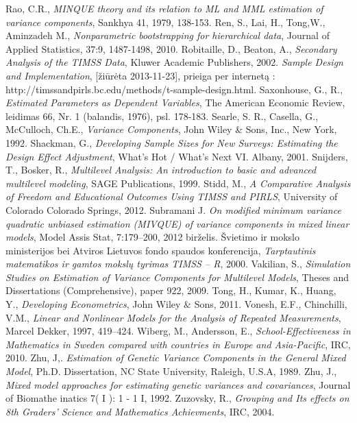 \documentclass[12pt,a4paper]{article}
\begin{document}
\begin{thebibliography}{1}
 Rao, C.R., \textit{MINQUE theory and its relation to ML and MML estimation of variance components}, Sankhya 41, 1979, 138-153.
 Ren, S., Lai, H., Tong,W., Aminzadeh M., \textit{Nonparametric bootstrapping for hierarchical data}, Journal of Applied Statistics, 37:9, 1487-1498, 2010.
 Robitaille, D., Beaton, A., \textit{Secondary Analysis of the TIMSS Data}, Kluwer Academic Publishers, 2002.
 \textit{Sample Design and Implementation}, [žiūrėta 2013-11-23], prieiga per internetą : http://timssandpirls.bc.edu/methods/t-sample-design.html.
 Saxonhouse, G., R., \textit{Estimated Parameters as Dependent Variables}, The American Economic Review,
leidimas 66, Nr. 1 (balandis, 1976), psl. 178-183.
 Searle, S. R., Casella, G., McCulloch, Ch.E., \textit{Variance Components}, John Wiley \& Sons, Inc., New York, 1992.
 Shackman, G., \textit{Developing Sample Sizes for New Surveys: Estimating the Design Effect Adjustment}, What’s Hot / What’s Next VI. Albany, 2001.
 Snijders, T., Bosker, R., \textit{Multilevel Analysis: An introduction to basic and advanced multilevel modeling}, SAGE Publications, 1999.
 Stidd, M., \textit{A Comparative Analysis of Freedom and Educational Outcomes Using TIMSS and PIRLS}, University of Colorado Colorado Springs, 2012.
Subramani J. \textit{On modified minimum variance quadratic unbiased estimation (MIVQUE) of variance components in mixed linear models}, Model Assis Stat, 7:179–200, 2012 birželis.
 Švietimo ir mokslo ministerijos bei Atviros Lietuvos fondo spaudos konferencija, \textit{Tarptautinis matematikos ir gamtos mokslų tyrimas TIMSS – R}, 2000.
 Vakilian, S., \textit{Simulation Studies on Estimation of Variance Components for Multilevel Models}, Theses and Dissertations (Comprehensive), paper 922, 2009.
 Tong, H., Kumar, K., Huang, Y., \textit{Developing Econometrics}, John Wiley \& Sons, 2011.
 Vonesh, E.F., Chinchilli, V.M., \textit{ Linear and Nonlinear Models for the Analysis of Repeated Measurements}, Marcel Dekker, 1997, 419–424.
 Wiberg, M., Andersson, E., \textit{School-Effectiveness in Mathematics in Sweden compared with countries in Europe and Asia-Pacific}, IRC, 2010.
 Zhu, J,. \textit{Estimation of Genetic Variance Components in the General Mixed Model},  Ph.D.
Dissertation, NC State University, Raleigh, U.S.A, 1989.   
 Zhu, J.,  \textit{Mixed model approaches for estimating genetic variances and covariances}, Journal of Biomathe inatics 7( I ): 1 - 1 I, 1992.
 Zuzovsky, R., \textit{Grouping and Its effects on 8th Graders' Science and Mathematics Achievments}, IRC, 2004.
\end{thebibliography}
\end{document}
